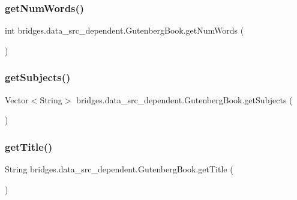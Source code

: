 \hypertarget{classbridges_1_1data__src__dependent_1_1_gutenberg_book_adf4daf7ef5446856d17749698bfec2a2}{}\label{classbridges_1_1data__src__dependent_1_1_gutenberg_book_adf4daf7ef5446856d17749698bfec2a2} 
\subsubsection{\texorpdfstring{get\+Num\+Words()}{getNumWords()}}
{\footnotesize\ttfamily int bridges.\+data\+\_\+src\+\_\+dependent.\+Gutenberg\+Book.\+get\+Num\+Words (\begin{DoxyParamCaption}{ }\end{DoxyParamCaption})}

\hypertarget{classbridges_1_1data__src__dependent_1_1_gutenberg_book_a2cc3e828698852aec79279857e519478}{}\label{classbridges_1_1data__src__dependent_1_1_gutenberg_book_a2cc3e828698852aec79279857e519478} 
\subsubsection{\texorpdfstring{get\+Subjects()}{getSubjects()}}
{\footnotesize\ttfamily Vector$<$String$>$ bridges.\+data\+\_\+src\+\_\+dependent.\+Gutenberg\+Book.\+get\+Subjects (\begin{DoxyParamCaption}{ }\end{DoxyParamCaption})}

\hypertarget{classbridges_1_1data__src__dependent_1_1_gutenberg_book_ae2d9bc547f329c9e6cc862e275b11f21}{}\label{classbridges_1_1data__src__dependent_1_1_gutenberg_book_ae2d9bc547f329c9e6cc862e275b11f21} 
\subsubsection{\texorpdfstring{get\+Title()}{getTitle()}}
{\footnotesize\ttfamily String bridges.\+data\+\_\+src\+\_\+dependent.\+Gutenberg\+Book.\+get\+Title (\begin{DoxyParamCaption}{ }\end{DoxyParamCaption})}

